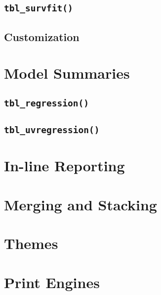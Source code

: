 \hypertarget{tbl_survfit}{%
\subsection{\texorpdfstring{\texttt{tbl\_survfit()}}{tbl\_survfit()}}\label{tbl_survfit}}

\hypertarget{customization}{%
\subsection{Customization}\label{customization}}

\hypertarget{model-summaries}{%
\section{Model Summaries}\label{model-summaries}}

\hypertarget{tbl_regression}{%
\subsection{\texorpdfstring{\texttt{tbl\_regression()}}{tbl\_regression()}}\label{tbl_regression}}

\hypertarget{tbl_uvregression}{%
\subsection{\texorpdfstring{\texttt{tbl\_uvregression()}}{tbl\_uvregression()}}\label{tbl_uvregression}}

\hypertarget{in-line-reporting}{%
\section{In-line Reporting}\label{in-line-reporting}}

\hypertarget{merging-and-stacking}{%
\section{Merging and Stacking}\label{merging-and-stacking}}

\hypertarget{themes}{%
\section{Themes}\label{themes}}

\hypertarget{print-engines}{%
\section{Print Engines}\label{print-engines}}

